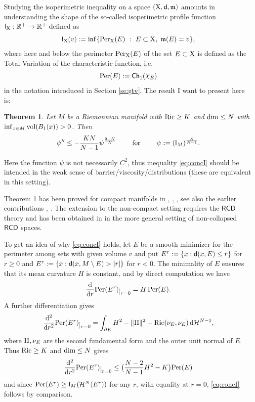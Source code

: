 \documentclass[11pt]{article}
\numberwithin{equation}{section}
\newtheorem{theorem}{Theorem}[section]
\newcommand{\R}{\mathbb{R}}
\newcommand{\restr}[1]{\lower3pt\hbox{$|_{#1}$}}
\newcommand{\X}{{\rm X}}
\newcommand{\sfd}{{\sf d}}
\newcommand{\mm}{{\mathfrak m}}
\newcommand{\RCD}{{\sf RCD}}
\newcommand{\ch}{{\sf Ch}}
\renewcommand{\d}{{\rm d}}
\newcommand{\nchi}{{\raise.3ex\hbox{$\chi$}}}
\begin{document}
Studying the isoperimetric inequality on a space $(\X,\sfd,\mm)$ amounts in understanding the shape of the so-called isoperimetric profile function ${\sf I}_\X:\R^+\to\R^+$ defined as 
\[
{\sf I}_\X(v):=\inf\{{\rm Per}_\X(E)\ :\ E\subset\X,\ \mm(E)=v\},
\]
where here and below the perimeter ${\rm Per}_\X(E)$ of the set $E\subset\X$ is defined as   the Total Variation of the characteristic function, i.e.\ 
\begin{equation}
\label{eq:perch1}
{\rm Per}(E):=\ch_1(\nchi_E)
\end{equation}
in the notation introduced in Section \ref{se:gtv}. The result I want to present here is:
\begin{theorem}\label{thm:concI}
Let $M$ be a Riemannian manifold with ${\rm Ric}\geq K$ and ${\rm dim}\leq N$ with $\inf_{x\in M}{\rm vol}(B_1(x))>0$. Then
\begin{equation}
\label{eq:concI}
\psi''\leq-\frac{KN}{N-1}\psi^{\frac{2-N}{N}}\qquad\text{ for }\qquad\psi:=({\sf I}_M)^{\frac N{N-1}}.
\end{equation}
\end{theorem}
Here the function $\psi$ is not necessarily $C^2$, thus inequality \eqref{eq:concI} should be intended in the weak sense of barrier/viscosity/distributions (these are equivalent in this setting).


Theorem \ref{thm:concI} has been proved for compact manifolds in \cite{MorJoh00}, \cite{Bay04}, \cite{NiWan16}, see also the earlier contributions \cite{BavPan86}, \cite{Gal88}. The extension to the non-compact setting requires the $\RCD$ theory and has been obtained  in \cite{APPS22b} in the more general setting of  non-collapsed $\RCD$ spaces.

To get an idea of why  \eqref{eq:concI} holds, let  $E$ be a smooth minimizer for the perimeter among sets with given volume $v$ and put $E^r:=\{x:\sfd(x,E)\leq r\}$ for $r\geq 0$ and $E^r:=\{x:\sfd(x,M\setminus E)>|r|\}$ for $r<0$. The minimality of $E$ ensures that its mean curvature $H$ is constant, and by direct computation we have
\begin{equation}
\label{eq:der1pe}
\frac{\d}{\d r}{\rm Per}(E^r)\restr{r=0}=H\,{\rm Per}(E).
\end{equation}
A further differentiation gives
\[
\frac{\d^2}{\d r^2}{\rm Per}(E^r)\restr{r=0}=\int_{\partial E}H^2-\|{\rm II}\|^2-{\rm Ric}(\nu_E,\nu_E)\,\d\mathcal H^{N-1},
\]
where ${\rm II},\nu_E$  are  the second fundamental form and the outer unit normal of $E$. Thus ${\rm Ric}\geq K$ and ${\rm dim}\leq N$ gives
\[
\frac{\d^2}{\d r^2}{\rm Per}(E^r)\restr{r=0}\leq \big(\frac{N-2}{N-1}H^2-K\big){\rm Per}(E)
\]
and since ${\rm Per}(E^r)\geq {\sf I}_M(\mathcal H^N(E^r))$ for any $r$, with equality at $r=0$, \eqref{eq:concI} follows by comparison.
\end{document}
